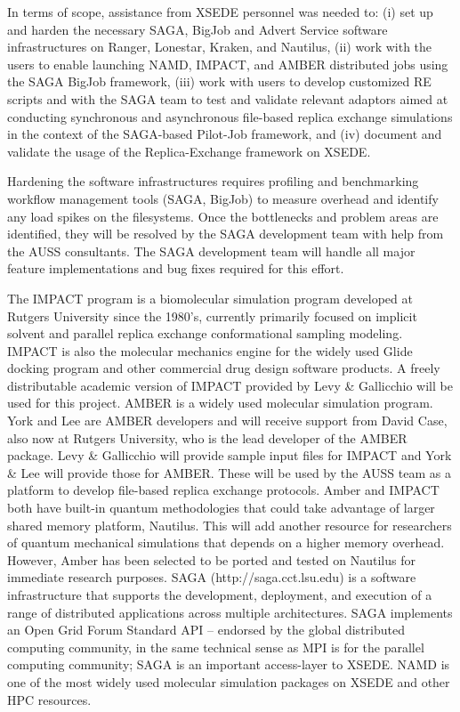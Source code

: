 \documentclass{sig-alternate}
\begin{document}
In terms of scope, assistance from XSEDE personnel was needed to: (i) set up and
harden the necessary SAGA, BigJob and Advert Service software infrastructures on
Ranger, Lonestar, Kraken, and Nautilus, (ii) work with the users to enable
launching NAMD, IMPACT, and AMBER distributed jobs using the SAGA BigJob
framework, (iii) work with users to develop customized RE scripts and with the
SAGA team to test and validate relevant adaptors aimed at conducting synchronous
and asynchronous ﬁle-based replica exchange simulations in the context of the
SAGA-based Pilot-Job framework, and (iv)  document and validate the usage of the
Replica-Exchange framework on XSEDE.

Hardening the software infrastructures requires profiling and benchmarking
workflow management tools (SAGA, BigJob) to measure overhead and identify any
load spikes on the filesystems. Once the bottlenecks and problem areas are
identified, they will be resolved by the SAGA development team with help from
the AUSS consultants. The SAGA development team will handle all major feature
implementations and bug fixes required for this effort. 

The IMPACT program is a biomolecular simulation program developed at Rutgers
University since the 1980’s, currently primarily focused on implicit solvent and
parallel replica exchange conformational sampling modeling. IMPACT is also the
molecular mechanics engine for the widely used Glide docking program and other
commercial drug design software products. A freely distributable academic
version of IMPACT provided by Levy \& Gallicchio will be used for this project.
AMBER is a widely used molecular simulation program. York and Lee are AMBER
developers and will receive support from David Case, also now at Rutgers
University, who is the lead developer of the AMBER package. Levy \& Gallicchio
will provide sample input files for IMPACT and York \& Lee will provide those for
AMBER. These will be used by the AUSS team as a platform to develop file-based
replica exchange protocols. Amber and IMPACT both have built-in quantum
methodologies that could take advantage of larger shared memory platform,
Nautilus. This will add another resource for researchers of quantum mechanical
simulations that depends on a higher memory overhead. However, Amber has been
selected to be ported and tested on Nautilus for immediate research purposes.
SAGA (http://saga.cct.lsu.edu) is a software infrastructure that supports the
development, deployment, and execution of a range of distributed applications
across multiple architectures. SAGA implements an Open Grid Forum Standard API –
endorsed by the global distributed computing community, in the same technical
sense as MPI is for the parallel computing community; SAGA is an important
access-layer to XSEDE.  NAMD is one of the most widely used molecular simulation
packages on XSEDE and other HPC resources.
\end{document}
